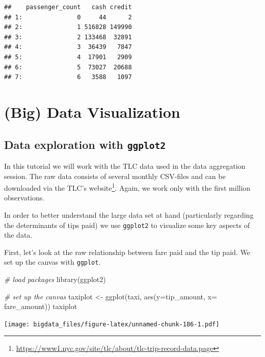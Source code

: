 \documentclass[
  12pt,
]{style/krantz}
\newenvironment{Shaded}{\begin{snugshade}}{\end{snugshade}}
\newcommand{\AttributeTok}[1]{\textcolor[rgb]{0.77,0.63,0.00}{#1}}
\newcommand{\CommentTok}[1]{\textcolor[rgb]{0.56,0.35,0.01}{\textit{#1}}}
\newcommand{\FunctionTok}[1]{\textcolor[rgb]{0.00,0.00,0.00}{#1}}
\newcommand{\NormalTok}[1]{#1}
\newcommand{\OtherTok}[1]{\textcolor[rgb]{0.56,0.35,0.01}{#1}}
\renewcommand{\href}[2]{#2\footnote{\url{#1}}}
\begin{document}
\begin{verbatim}
##    passenger_count   cash credit
## 1:               0     44      2
## 2:               1 516828 149990
## 3:               2 133468  32891
## 4:               3  36439   7847
## 5:               4  17901   2909
## 6:               5  73027  20688
## 7:               6   3588   1097
\end{verbatim}

\hypertarget{big-data-visualization}{%
\chapter{(Big) Data Visualization}\label{big-data-visualization}}

\hypertarget{data-exploration-with-ggplot2}{%
\section{\texorpdfstring{Data exploration with \texttt{ggplot2}}{Data exploration with ggplot2}}\label{data-exploration-with-ggplot2}}

In this tutorial we will work with the TLC data used in the data aggregation session. The raw data consists of several monthly CSV-files and can be downloaded via the \href{https://www1.nyc.gov/site/tlc/about/tlc-trip-record-data.page}{TLC's website}. Again, we work only with the first million observations.

In order to better understand the large data set at hand (particularly regarding the determinants of tips paid) we use \texttt{ggplot2} to visualize some key aspects of the data.

First, let's look at the raw relationship between fare paid and the tip paid. We set up the canvas with \texttt{ggplot}.

\begin{Shaded}
\begin{Highlighting}[]
\CommentTok{\# load packages}
\FunctionTok{library}\NormalTok{(ggplot2)}

\CommentTok{\# set up the canvas}
\NormalTok{taxiplot }\OtherTok{\textless{}{-}} \FunctionTok{ggplot}\NormalTok{(taxi, }\FunctionTok{aes}\NormalTok{(}\AttributeTok{y=}\NormalTok{tip\_amount, }\AttributeTok{x=}\NormalTok{ fare\_amount)) }
\NormalTok{taxiplot}
\end{Highlighting}
\end{Shaded}

\texttt{[image: bigdata\_files/figure-latex/unnamed-chunk-186-1.pdf]}
\end{document}
